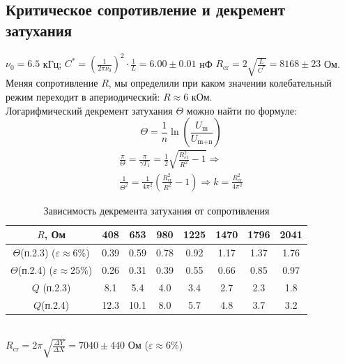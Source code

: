 \subsection*{Критическое сопротивление и декремент затухания}
\indent $\nu_0 = 6.5$ кГц; $C^{*} = \left (\frac{1}{2\pi \nu_0}\right ) ^ 2 \cdot \frac{1}{L} = 6.00 \pm 0.01$ нФ
$R_{\text{cr}} = 2\sqrt{\frac{L}{C^{*}}} = 8168 \pm 23$ Ом. \\
\indent Меняя сопротивление $R$, мы определили при каком значении колебательный режим переходит в апериодический: $R \approx 6$ кОм.\\\indent 
Логарифмический декремент затухания $\Theta$ можно найти по формуле:
\begin{equation}
    \Theta = \frac{1}{n}\ln\left (\frac{U_{\text{m}}}{U_{\text{m+n}}}\right )
\end{equation}
\begin{align}
    \frac{\pi}{\Theta} = \frac{\pi}{\gamma T_1} = \frac{1}{2}\sqrt{\frac{R_{\text{cr}}^2}{R^2} - 1} \Rightarrow\\
    \frac{1}{\Theta^2} = \frac{1}{4\pi^2}\left ( \frac{R_{\text{cr}}^2}{R^2} - 1 \right ) \Rightarrow k = \frac{R_{\text{cr}}^2}{4\pi^2}
\end{align}
\begin{table}[h!]
    \centering
    \begin{tabular}{|c|c|c|c|c|c|c|c|}
        \hline
        $R$, Ом & 408 & 653 & 980 & 1225 & 1470 & 1796 & 2041\\\hline
        $\Theta$(п.2.3) ($\varepsilon\approx 6\%$)& 0.39& 0.59& 0.78& 0.92& 1.17& 1.37& 1.76\\\hline
        $\Theta$(п.2.4) ($\varepsilon\approx 25\%$)& 0.26& 0.31& 0.39& 0.55& 0.66& 0.85& 0.97\\\hline
        $Q$ (п.2.3) &8.1& 5.4& 4.0& 3.4& 2.7& 2.3& 1.8\\\hline
        $Q$(п.2.4) &12.3& 10.1& 8.0& 5.7& 4.8& 3.7& 3.2\\\hline
    \end{tabular}
    \caption{Зависимость декремента затухания от сопротивления}
\end{table}
\\
\indent $R_{\text{cr}} = 2\pi\sqrt{\frac{\Delta Y}{\Delta X}} = 7040 \pm 440$ Ом ($\varepsilon \approx 6\%$)

